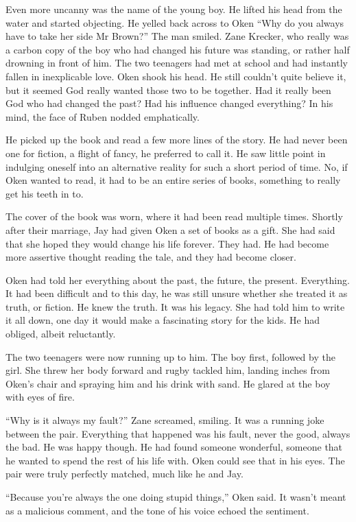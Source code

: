 Even more uncanny was the name of the young boy.  He lifted his head from the water and started objecting.  He yelled back across to Oken ``Why do you always have to take her side Mr Brown?''  The man smiled.  Zane Krecker, who really was a carbon copy of the boy who had changed his future was standing, or rather half drowning in front of him.  The two teenagers had met at school and had instantly fallen in inexplicable love.  Oken shook his head.  He still couldn't quite believe it, but it seemed God really wanted those two to be together.  Had it really been God who had changed the past?  Had his influence changed everything?  In his mind, the face of Ruben nodded emphatically.

He picked up the book and read a few more lines of the story.  He had never been one for fiction, a flight of fancy, he preferred to call it.  He saw little point in indulging oneself into an alternative reality for such a short period of time.  No, if Oken wanted to read, it had to be an entire series of books, something to really get his teeth in to.

The cover of the book was worn, where it had been read multiple times.  Shortly after their marriage, Jay had given Oken a set of books as a gift.  She had said that she hoped they would change his life forever.  They had.  He had become more assertive thought reading the tale, and they had become closer.  

Oken had told her everything about the past, the future, the present.  Everything.  It had been difficult and to this day, he was still unsure whether she treated it as truth, or fiction.  He knew the truth.  It was his legacy.  She had told him to write it all down, one day it would make a fascinating story for the kids.  He had obliged, albeit reluctantly.  

The two teenagers were now running up to him.  The boy first, followed by the girl.  She threw her body forward and rugby tackled him, landing inches from Oken's chair and spraying him and his drink with sand.  He glared at the boy with eyes of fire.

``Why is it always my fault?'' Zane screamed, smiling.  It was a running joke between the pair.  Everything that happened was his fault, never the good, always the bad.  He was happy though.  He had found someone wonderful, someone that he wanted to spend the rest of his life with.  Oken could see that in his eyes.  The pair were truly perfectly matched, much like he and Jay.  

``Because you're always the one doing stupid things,'' Oken said.  It wasn't meant as a malicious comment, and the tone of his voice echoed the sentiment.

